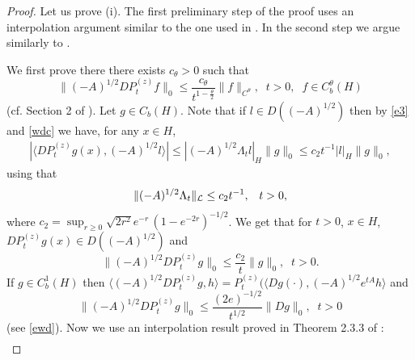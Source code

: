 \documentclass[preprint]{imsart}
\begin{document}
\begin{proof} 
 Let us prove (i). The  first preliminary step of the proof uses an interpolation argument similar to the one used in    \cite{D2}.
 In the second step we argue  similarly to \cite{PriolaStudia}.  

\vskip 1mm  
 We first prove  there there exists $c_{\theta} >0$ such that 
\begin{equation}\label{qhol}
 \| (-A)^{1/2} DP_t^{(z)}  f \|_0  \le  \frac{c_{\theta}}{t^{1 - \frac{\theta}{2}}}\|f\|_{C^{\theta}},\;\; t>0,\;\; f \in C_b^{\theta}(H) 
\end{equation}
(cf. Section 2 of \cite{D2}). 
  Let $g \in C_b(H)$. Note that if $l \in D((-A)^{1/2})$ then by \eqref{e3} and \eqref{wdc} we have, for any $x \in H$,
\begin{gather} \label{256}
|\langle DP_t^{(z)} g(x) , (-A)^{1/2} l\rangle| 
 \le |(-A)^{1/2} \Lambda_t l |_H \| g\|_0 \le {c_2} {t}^{-1} |l|_H \| g\|_0,
\end{gather}
using   that 
 \begin{gather*}
\|  (-A)^{1/2} \Lambda_t \|_{\cal L} \le {c_2} {t}^{-1},\;\;\; t>0,
\end{gather*}
where $c_2 = \sup_{r \ge 0} \sqrt{2 r^2}  e^{-r} \,  (1 - e^{-2r})^{-1/2}$.
We get 
 that for $t>0$, $x \in H$, $DP_t^{(z)} g(x) \in D((-A)^{1/2})$ and
 \begin{equation}\label{vfg}
\|   (-A)^{1/2} D P_t^{(z)} g \|_{0} \le \frac{c_2} {t} \| g \|_0, \; \; t>0. 
\end{equation}
If $g \in C^1_b(H)$ then  $ \langle (-A)^{1/2} D P_t^{(z)} g , h\rangle =  
  P_t^{(z)} (\langle Dg(\cdot ) , (-A)^{1/2} e^{tA}  h\rangle $ and 
 \begin{equation}\label{qww}
\|   (-A)^{1/2} D P_t^{(z)} g \|_{0} \le \frac{(2e)^{-1/2}} {t^{1/2}} \| Dg\|_0, \; \; t>0
\end{equation} 
 (see \eqref{ewd}). Now we use an interpolation result proved in Theorem 2.3.3 of \cite{DZ1}:
 \begin{gather*} 

\end{gather*}
\end{proof}
\end{document}
